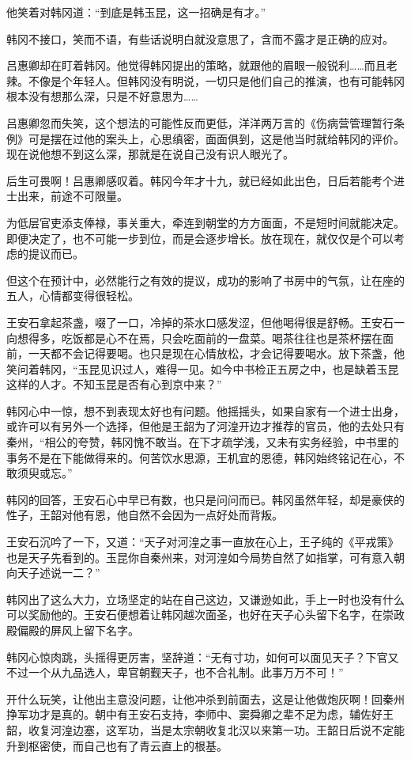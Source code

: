 他笑着对韩冈道：“到底是韩玉昆，这一招确是有才。”

韩冈不接口，笑而不语，有些话说明白就没意思了，含而不露才是正确的应对。

吕惠卿却在盯着韩冈。他觉得韩冈提出的策略，就跟他的眉眼一般锐利……而且老辣。不像是个年轻人。但韩冈没有明说，一切只是他们自己的推演，也有可能韩冈根本没有想那么深，只是不好意思为……

吕惠卿忽而失笑，这个想法的可能性反而更低，洋洋两万言的《伤病营管理暂行条例》可是摆在过他的案头上，心思缜密，面面俱到，这是他当时就给韩冈的评价。现在说他想不到这么深，那就是在说自己没有识人眼光了。

后生可畏啊！吕惠卿感叹着。韩冈今年才十九，就已经如此出色，日后若能考个进士出来，前途不可限量。

为低层官吏添支俸禄，事关重大，牵连到朝堂的方方面面，不是短时间就能决定。即便决定了，也不可能一步到位，而是会逐步增长。放在现在，就仅仅是个可以考虑的提议而已。

但这个在预计中，必然能行之有效的提议，成功的影响了书房中的气氛，让在座的五人，心情都变得很轻松。

王安石拿起茶盏，啜了一口，冷掉的茶水口感发涩，但他喝得很是舒畅。王安石一向想得多，吃饭都是心不在焉，只会吃面前的一盘菜。喝茶往往也是茶杯摆在面前，一天都不会记得要喝。也只是现在心情放松，才会记得要喝水。放下茶盏，他笑问着韩冈，“玉昆见识过人，难得一见。如今中书检正五房之中，也是缺着玉昆这样的人才。不知玉昆是否有心到京中来？”

韩冈心中一惊，想不到表现太好也有问题。他摇摇头，如果自家有一个进士出身，或许可以有另外一个选择，但他是王韶为了河湟开边才推荐的官员，他的去处只有秦州，“相公的夸赞，韩冈愧不敢当。在下才疏学浅，又未有实务经验，中书里的事务不是在下能做得来的。何苦饮水思源，王机宜的恩德，韩冈始终铭记在心，不敢须臾或忘。”

韩冈的回答，王安石心中早已有数，也只是问问而已。韩冈虽然年轻，却是豪侠的性子，王韶对他有恩，他自然不会因为一点好处而背叛。

王安石沉吟了一下，又道：“天子对河湟之事一直放在心上，王子纯的《平戎策》也是天子先看到的。玉昆你自秦州来，对河湟如今局势自然了如指掌，可有意入朝向天子述说一二？”

韩冈出了这么大力，立场坚定的站在自己这边，又谦逊如此，手上一时也没有什么可以奖励他的。王安石便想着让韩冈越次面圣，也好在天子心头留下名字，在崇政殿偏殿的屏风上留下名字。

韩冈心惊肉跳，头摇得更厉害，坚辞道：“无有寸功，如何可以面见天子？下官又不过一个从九品选人，卑官朝觐天子，也不合礼制。此事万万不可！”

开什么玩笑，让他出主意没问题，让他冲杀到前面去，这是让他做炮灰啊！回秦州挣军功才是真的。朝中有王安石支持，李师中、窦舜卿之辈不足为虑，辅佐好王韶，收复河湟边塞，这军功，当是太宗朝收复北汉以来第一功。王韶日后说不定能升到枢密使，而自己也有了青云直上的根基。

